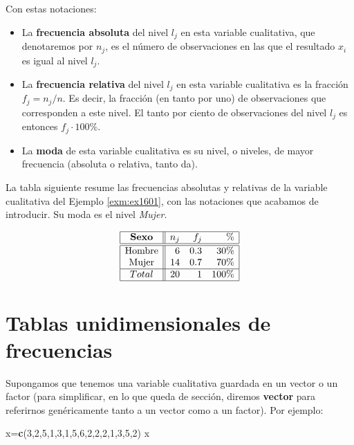 \documentclass[]{book}
\newenvironment{Shaded}{\begin{snugshade}}{\end{snugshade}}
\newcommand{\DecValTok}[1]{\textcolor[rgb]{0.00,0.00,0.81}{#1}}
\newcommand{\KeywordTok}[1]{\textcolor[rgb]{0.13,0.29,0.53}{\textbf{#1}}}
\newcommand{\NormalTok}[1]{#1}
\theoremstyle{definition}
\theoremstyle{definition}
\theoremstyle{definition}
\theoremstyle{remark}
\begin{document}
Con estas notaciones:

\begin{itemize}
\item
  La \textbf{frecuencia absoluta} del nivel \(l_j\) en esta variable cualitativa, que denotaremos por \(n_j\), es el número de observaciones en las que el resultado \(x_i\) es igual al nivel \(l_j\).
\item
  La \textbf{frecuencia relativa} del nivel \(l_j\) en esta variable cualitativa es la fracción \(f_j={n_j}/{n}\). Es decir, la fracción (en tanto por uno) de observaciones que corresponden a este nivel. El tanto por ciento de observaciones del nivel \(l_j\) es entonces \(f_j\cdot 100\%\).
\item
  La \textbf{moda} de esta variable cualitativa es su nivel, o niveles, de mayor frecuencia (absoluta o relativa, tanto da).
\end{itemize}

La tabla siguiente resume las frecuencias absolutas y relativas de la variable cualitativa del Ejemplo \ref{exm:ex1601}, con las notaciones que acabamos de introducir. Su moda es el nivel \emph{Mujer}.

\[
\begin{array}{|c||rrr|}
\hline \mathbf{Sexo} & n_j & f_j & \% \\\hline\hline
\mbox{Hombre} & 6 & 0.3 & 30\% \\
\mbox{Mujer} & 14 & 0.7 & 70 \% \\\hline
Total & 20 & 1 & 100\% \\\hline
\end{array}
\]

\hypertarget{tablas-unidimensionales-de-frecuencias}{%
\section{Tablas unidimensionales de frecuencias}\label{tablas-unidimensionales-de-frecuencias}}

Supongamos que tenemos una variable cualitativa guardada en un vector o un factor (para simplificar, en lo que queda de sección, diremos \textbf{vector} para referirnos genéricamente tanto a un vector como a un factor). Por ejemplo:

\begin{Shaded}
\begin{Highlighting}[]
\NormalTok{x=}\KeywordTok{c}\NormalTok{(}\DecValTok{3}\NormalTok{,}\DecValTok{2}\NormalTok{,}\DecValTok{5}\NormalTok{,}\DecValTok{1}\NormalTok{,}\DecValTok{3}\NormalTok{,}\DecValTok{1}\NormalTok{,}\DecValTok{5}\NormalTok{,}\DecValTok{6}\NormalTok{,}\DecValTok{2}\NormalTok{,}\DecValTok{2}\NormalTok{,}\DecValTok{2}\NormalTok{,}\DecValTok{1}\NormalTok{,}\DecValTok{3}\NormalTok{,}\DecValTok{5}\NormalTok{,}\DecValTok{2}\NormalTok{)}
\NormalTok{x}
\end{Highlighting}
\end{Shaded}
\end{document}
